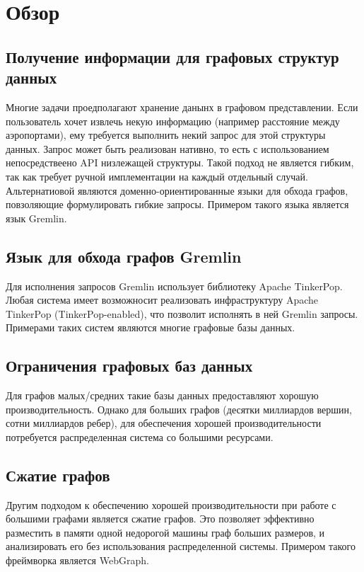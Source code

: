 \documentclass[times,specification,annotation]{itmo-student-thesis}
\begin{document}
\chapter{Обзор}

\section{Получение информации для графовых структур данных}

Многие задачи проедполагают хранение данынх в графовом представлении. Если пользователь хочет извлечь некую информацию (например расстояние между аэропортами), ему требуется выполнить некий запрос для этой структуры данных. Запрос может быть реализован нативно, то есть с использованием непосредствеено API низлежащей структуры. Такой подход не является гибким, так как требует ручной имплементации на каждый отдельный случай. Альтернатиовой являются доменно-ориентированные языки для обхода графов, повзоляющие формулировать гибкие запросы. Примером такого языка является язык Gremlin.

\section{Язык для обхода графов Gremlin}

Для исполнения запросов Gremlin использует библиотеку Apache TinkerPop. Любая система имеет возможносит реализовать инфраструктуру Apache TinkerPop (TinkerPop-enabled), что позволит исполнять в ней Gremlin запросы.
Примерами таких систем являются многие графовые базы данных.

\section{Ограничения графовых баз данных}

Для графов малых/средних такие базы данных предоставляют хорошую производительность. Однако для больших графов (десятки миллиардов вершин, сотни миллиардов ребер), для обеспечения хорошей производительности потребуется распределенная система со большими ресурсами. 

\section{Сжатие графов}

Другим подходом к обеспечению хорошей производительности при работе с большими графами является сжатие графов. Это позволяет эффективно разместить в памяти одной недорогой машины граф больших размеров, и анализировать его без использования распределенной системы. Примером такого фреймворка является WebGraph.
\end{document}
